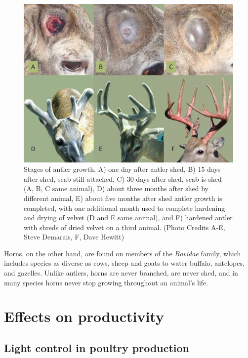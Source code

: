 \documentclass[]{book}
\begin{document}
\begin{figure}

{\centering \includegraphics[width=1\linewidth]{figures/antler-stages} 

}

\caption{Stages of antler growth. A) one day after antler shed, B) 15 days after shed, scab still attached, C) 30 days after shed, scab is shed (A, B, C same animal), D) about three months after shed by different animal, E) about five months after shed antler growth is completed, with one additional month used to complete hardening and drying of velvet (D and E same animal), and F) hardened antler with shreds of dried velvet on a third animal. (Photo Credits A-E, Steve Demarais, F, Dave Hewitt)}\label{fig:antler-stage}
\end{figure}

Horns, on the other hand, are found on members of the \emph{Bovidae} family, which includes species as diverse as cows, sheep and goats to water buffalo, antelopes, and gazelles. Unlike antlers, horns are never branched, are never shed, and in many species horns never stop growing throughout an animal's life.

\hypertarget{effects-on-productivity}{%
\section{Effects on productivity}\label{effects-on-productivity}}

\hypertarget{light-control-in-poultry-production}{%
\subsection{Light control in poultry production}\label{light-control-in-poultry-production}}
\end{document}
